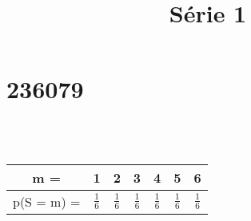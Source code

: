 \documentclass[12pt,a4paper]{article}
\title{Série 1}
\date{}
\begin{document}
\maketitle
\part*{236079}
\\
\\
\begin{center}
\begin{tabular}{|c|c|c|c|c|c|c|}
m = & 1 & 2 & 3 & 4 & 5 & 6 \\
\hline
p(S = m) = &$\frac{1}{6}$&$\frac{1}{6}$&$\frac{1}{6}$&$\frac{1}{6}$&$\frac{1}{6}$&$\frac{1}{6}$\\
\end{tabular}\\\end{center}
${}$\\
\end{document}
